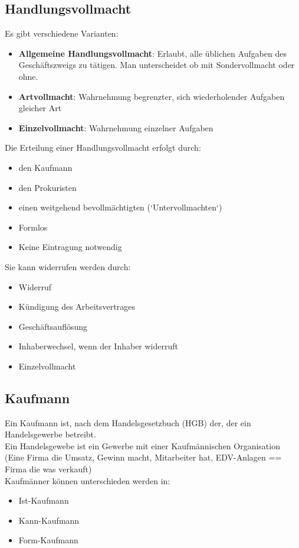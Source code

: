 \documentclass[10pt]{article}
\begin{document}
\subsection{Handlungsvollmacht}
Es gibt verschiedene Varianten:
\begin{itemize}
\item \textbf{Allgemeine Handlungsvollmacht}: Erlaubt, alle üblichen Aufgaben des Geschäftszweigs zu tätigen. Man unterscheidet ob mit Sondervollmacht oder ohne.
\item \textbf{Artvollmacht}: Wahrnehmung begrenzter, sich wiederholender Aufgaben gleicher Art
\item \textbf{Einzelvollmacht}:  Wahrnehmung einzelner Aufgaben
\end{itemize}
Die  Erteilung einer  Handlungsvollmacht  erfolgt durch:
\begin{itemize}
\item den Kaufmann
\item den Prokuristen
\item einen weitgehend bevollmächtigten (`Untervollmachten`)
\item Formlos
\item Keine Eintragung notwendig
\end{itemize}
Sie kann widerrufen werden durch:
\begin{itemize}
\item Widerruf
\item Kündigung des Arbeitsvertrages
\item Geschäftsauflösung
\item Inhaberwechsel, wenn der Inhaber widerruft
\item Einzelvollmacht
\end{itemize}

\subsection{Kaufmann}
Ein Kaufmann ist, nach dem Handelsgesetzbuch (HGB) der, der ein Handelsgewerbe betreibt. \\
Ein Handelsgewebe ist ein Gewerbe mit einer Kaufmännischen Organisation\\
(Eine Firma die Umsatz, Gewinn macht, Mitarbeiter hat, EDV-Anlagen == Firma die was verkauft) \\
Kaufmänner können unterschieden werden in:
\begin{itemize}
\item Ist-Kaufmann
\item Kann-Kaufmann
\item Form-Kaufmann
\end{itemize}
\end{document}
